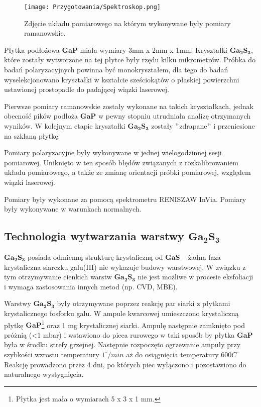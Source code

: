 \begin{figure}[H]
	\begin{center}
		\texttt{[image: Przygotowania/Spektroskop.png]}
		\caption{Zdjęcie układu pomiarowego na którym wykonywane były pomiary ramanowskie.}
	\end{center}
\end{figure}

Płytka podłożowa $\mathbf{GaP}$ miała wymiary 3mm x 2mm x 1mm. Kryształki $\mathbf{Ga_{2}S_{3}}$, które zostały wytworzone na tej płytce były rzędu kilku mikrometrów. Próbka do badań polaryzacyjnych powinna być monokryształem, dla tego do badań wyselekcjonowano kryształki w kształcie sześciokątów o płaskiej powierzchni ustawionej prostopadle do padającej wiązki laserowej.

Pierwsze pomiary ramanowskie zostały wykonane na takich kryształkach, jednak obecność pików podłoża $\mathbf{GaP}$ w pewny stopniu utrudniała analizę otrzymanych wyników. W kolejnym etapie kryształki $\mathbf{Ga_{2}S_{3}}$ zostały $"$zdrapane$"$ i przeniesione na szklaną płytkę.

Pomiary polaryzacyjne były wykonywane w jednej wielogodzinnej sesji pomiarowej. Uniknięto w ten sposób błędów związanych z rozkalibrowaniem układu pomiarowego, a także ze zmianę orientacji próbki pomiarowej, względem wiązki laserowej.

Pomiary były wykonane za pomocą spektrometru RENISZAW InVia. Pomiary były wykonywane w warunkach normalnych.

\subsection{Technologia wytwarzania warstwy $\mathbf{Ga_{2}S_{3}}$} 

$\mathbf{Ga_{2}S_{3}}$ posiada odmienną strukturę krystaliczną od $\mathbf{GaS}$ – żadna faza krystaliczna siarczku galu(III) nie wykazuje budowy warstwowej. W związku z tym otrzymywanie cienkich warstw $\mathbf{Ga_{2}S_{3}}$ nie jest możliwe w procesie eksfoliacji i wymaga zastosowania innych metod (np. CVD, MBE).

Warstwy $\mathbf{Ga_{2}S_{3}}$ były otrzymywane poprzez reakcję par siarki z płytkami krystalicznego fosforku galu. W ampule kwarcowej umieszczono krystaliczną płytkę $\mathbf{GaP}$\footnote{Płytka jest mała o wymiarach 5 x 3 x 1 mm.} oraz 1 mg krystalicznej siarki. Ampułę następnie zamknięto pod próżnią (<1 mbar) i wstawiono do pieca rurowego w taki sposób by płytka $\mathbf{GaP}$ była w środku strefy grzejnej. Następnie rozpoczęto ogrzewanie ampuły przy szybkości wzrostu temperatury $1^{\circ}/min$ aż do osiągnięcia temperatury 600$C^{\circ}$ Reakcję prowadzono przez 4 dni, po których piec wyłączono i pozostawiono do naturalnego wystygnięcia.

